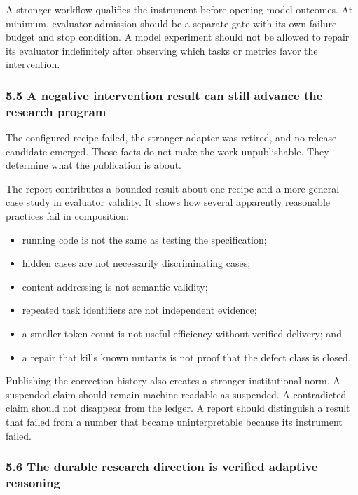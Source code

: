 \documentclass[
  9pt,
  letterpaper,
]{article}
\providecommand{\tightlist}{%
  \setlength{\itemsep}{0pt}\setlength{\parskip}{0pt}}
\begin{document}
A stronger workflow qualifies the instrument before opening model
outcomes. At minimum, evaluator admission should be a separate gate with
its own failure budget and stop condition. A model experiment should not
be allowed to repair its evaluator indefinitely after observing which
tasks or metrics favor the intervention.

\hypertarget{55-a-negative-intervention-result-can-still-advance-the-research-program}{%
\subsubsection{5.5 A negative intervention result can still advance the
research
program}\label{55-a-negative-intervention-result-can-still-advance-the-research-program}}

The configured recipe failed, the stronger adapter was retired, and no
release candidate emerged. Those facts do not make the work
unpublishable. They determine what the publication is about.

The report contributes a bounded result about one recipe and a more
general case study in evaluator validity. It shows how several
apparently reasonable practices fail in composition:

\begin{itemize}
\tightlist
\item
  running code is not the same as testing the specification;
\item
  hidden cases are not necessarily discriminating cases;
\item
  content addressing is not semantic validity;
\item
  repeated task identifiers are not independent evidence;
\item
  a smaller token count is not useful efficiency without verified
  delivery; and
\item
  a repair that kills known mutants is not proof that the defect class
  is closed.
\end{itemize}

Publishing the correction history also creates a stronger institutional
norm. A suspended claim should remain machine-readable as suspended. A
contradicted claim should not disappear from the ledger. A report should
distinguish a result that failed from a number that became
uninterpretable because its instrument failed.

\hypertarget{56-the-durable-research-direction-is-verified-adaptive-reasoning}{%
\subsubsection{5.6 The durable research direction is verified adaptive
reasoning}\label{56-the-durable-research-direction-is-verified-adaptive-reasoning}}
\end{document}
